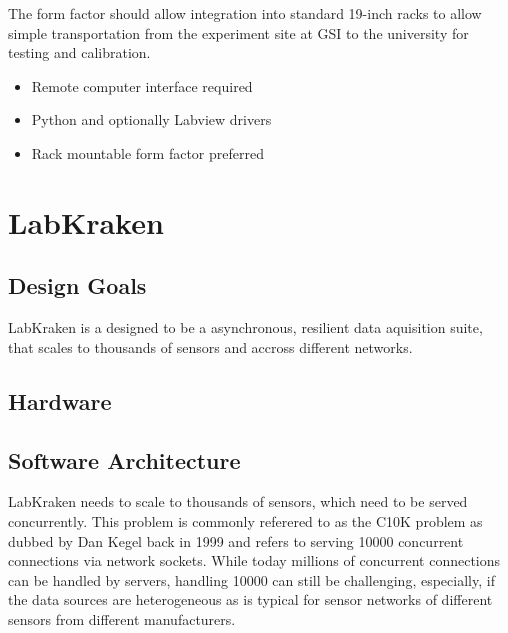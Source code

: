 The form factor should allow integration into standard 19-inch racks to allow simple transportation from the experiment site at GSI to the university for testing and calibration.

\begin{center}
    \begin{tcolorbox}[
        new/auto counter,
        new/number within=chapter,
        colback=red!5!white,
        colframe=red!75!black,
        title=Current source user interface and form factor,
        width=0.8\linewidth,
        label={lst:dgDrive_form_factor}
        ]
    \begin{itemize}
        \item Remote computer interface required
        \item Python and optionally Labview drivers
        \item Rack mountable form factor preferred
    \end{itemize}
    \end{tcolorbox}
\end{center}

\clearpage
\section{LabKraken}
\subsection{Design Goals}
LabKraken is a designed to be a asynchronous, resilient data aquisition suite, that scales to thousands of sensors and accross different networks.
\subsection{Hardware}
\subsection{Software Architecture}
LabKraken needs to scale to thousands of sensors, which need to be served concurrently. This problem is commonly referered to as the C10K problem as dubbed by Dan Kegel back in 1999 \cite{10kProblem} and refers to serving \num{10000} concurrent connections via network sockets. While today millions of concurrent connections can be handled by servers, handling \num{10000} can still be challenging, especially, if the data sources are heterogeneous as is typical for sensor networks of different sensors from different manufacturers.

